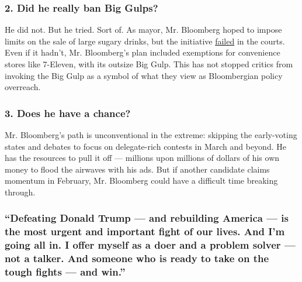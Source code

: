 \hypertarget{2-did-he-really-ban-big-gulps}{%
\subsubsection{\texorpdfstring{\textbf{2. Did he really ban Big
Gulps?}}{2. Did he really ban Big Gulps?}}\label{2-did-he-really-ban-big-gulps}}

He did not. But he tried. Sort of. As mayor, Mr. Bloomberg hoped to
impose limits on the sale of large sugary drinks, but the initiative
\href{https://www.nytimes3xbfgragh.onion/2014/06/27/nyregion/city-loses-final-appeal-on-limiting-sales-of-large-sodas.html}{failed}
in the courts. Even if it hadn't, Mr. Bloomberg's plan included
exemptions for convenience stores like 7-Eleven, with its outsize Big
Gulp. This has not stopped critics from invoking the Big Gulp as a
symbol of what they view as Bloombergian policy overreach.

\hypertarget{3-does-he-have-a-chance}{%
\subsubsection{\texorpdfstring{\textbf{3. Does he have a
chance?}}{3. Does he have a chance?}}\label{3-does-he-have-a-chance}}

Mr. Bloomberg's path is unconventional in the extreme: skipping the
early-voting states and debates to focus on delegate-rich contests in
March and beyond. He has the resources to pull it off --- millions upon
millions of dollars of his own money to flood the airwaves with his ads.
But if another candidate claims momentum in February, Mr. Bloomberg
could have a difficult time breaking through.

\hypertarget{defeating-donald-trump--and-rebuilding-america--is-the-most-urgent-and-important-fight-of-our-lives-and-im-going-all-in-i-offer-myself-as-a-doer-and-a-problem-solver--not-a-talker-and-someone-who-is-ready-to-take-on-the-tough-fights--and-win}{%
\subsubsection{``Defeating Donald Trump --- and rebuilding America ---
is the most urgent and important fight of our lives. And I'm going all
in. I offer myself as a doer and a problem solver --- not a talker. And
someone who is ready to take on the tough fights --- and
win.''}\label{defeating-donald-trump--and-rebuilding-america--is-the-most-urgent-and-important-fight-of-our-lives-and-im-going-all-in-i-offer-myself-as-a-doer-and-a-problem-solver--not-a-talker-and-someone-who-is-ready-to-take-on-the-tough-fights--and-win}}

